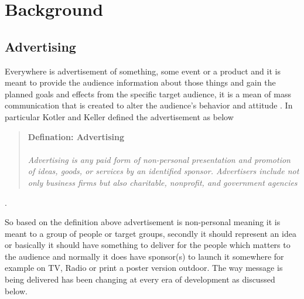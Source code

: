 
\chapter{Background} %

\label{Chapter2} %
\newpage

\section{Advertising}

Everywhere is advertisement of something, some event or a product and it is meant to provide the audience information about those things and gain the planned goals and effects from the specific target audience, it is a mean of mass communication that is created to alter the audience’s behavior and attitude \cite{advertisementdef}. In particular Kotler and Keller defined the advertisement as below

\begin{snugshade}
\begin{quote}\textbf{Defination: Advertising }\\ \\ \emph{Advertising is any paid form of non-personal presentation and promotion of ideas, goods, or services by an identified sponsor. Advertisers include not only business firms but also charitable, nonprofit, and government agencies}\end{quote}\cite{ad_def}.
\end{snugshade}

So based on the definition above advertisement is non-personal meaning it is meant to a group of people or target groups, secondly it should represent an idea or basically it should have something to deliver for the people which matters to the audience and normally it does have sponsor(s) to launch it somewhere for example on TV, Radio or print a poster version outdoor. The way message is being delivered has been changing at every era of development as discussed below.



